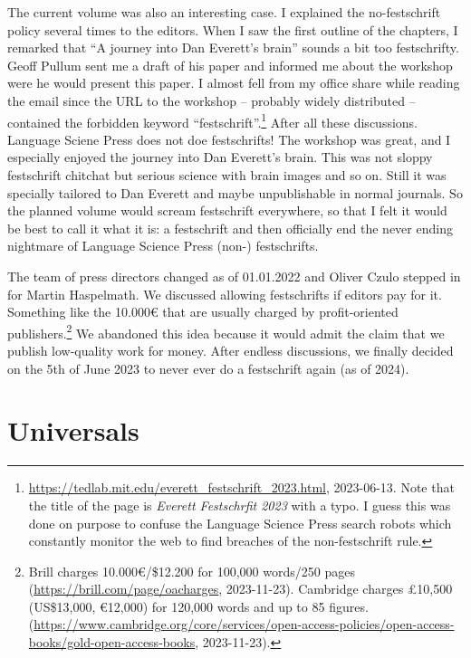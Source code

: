 \documentclass[output=paper,colorlinks,citecolor=brown]{langscibook}
\begin{document}
The current volume was also an interesting case. I explained the no-festschrift policy several
times to the editors. When I saw the first outline of the chapters, I remarked that ``A journey into Dan Everett's
brain'' sounds a bit too festschrifty. Geoff Pullum sent me a draft of his paper and informed me
about the workshop were he would present this paper. I almost fell from my office share while
reading the email since the URL to the workshop -- probably widely distributed -- contained the forbidden keyword
``festschrift''.\footnote{
\url{https://tedlab.mit.edu/everett_festschrift_2023.html}, 2023-06-13. Note that the title of the
page is \emph{Everett Festschrfit 2023} with a typo. I guess this was done on purpose to confuse the
Language Science Press search robots which constantly monitor the web to find breaches of the
non-festschrift rule.
} After all these discussions. Language Sciene Press does not doe festschrifts! The
workshop was great, and I especially enjoyed the journey into Dan Everett's brain. This was not
sloppy festschrift chitchat but serious science with brain images and so on. Still it was specially
tailored to Dan Everett and maybe unpublishable in normal journals. So the planned volume would
scream festschrift everywhere, so that I felt it would be best to call it what it is: a festschrift
and then officially end the never ending nightmare of Language Science Press (non-) festschrifts. 

The team of press directors changed as of 01.01.2022 and Oliver Czulo stepped in for
Martin Haspelmath. We discussed allowing festschrifts if editors pay for it. Something like the
10.000€ that are usually charged by profit-oriented publishers.\footnote{
Brill charges 10.000€/\$12.200 for 100,000 words/250 pages (\url{https://brill.com/page/oacharges},
2023-11-23). Cambridge charges £10,500 (US\$13,000, €12,000) for 120,000 words and up to 85 figures.
(\url{https://www.cambridge.org/core/services/open-access-policies/open-access-books/gold-open-access-books}, 2023-11-23).
} 
 We abandoned this idea because it
would admit the claim that we publish low-quality work for money. After endless discussions, we
finally decided on the 5th of June 2023 to never ever do a festschrift again (as of 2024). 






\section{Universals}
\end{document}
